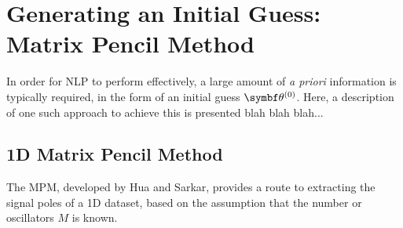 \section{Generating an Initial Guess: Matrix Pencil Method}
\label{sec:mpm}
In order for \ac{NLP} to perform effectively, a large amount of \textit{a
priori} information is typically required, in the form of an initial guess
$\bthzero$. Here, a description of one such approach to achieve this is presented blah blah blah...

\subsection{1D Matrix Pencil Method}
\label{subsec:mpm}
The \ac{MPM}, developed by Hua and Sarkar\cite{Hua1990,Hua1990b,Hua1991}, provides a
route to extracting the signal poles of a \ac{1D} dataset, based on the
assumption that the number or oscillators $M$ is known.

